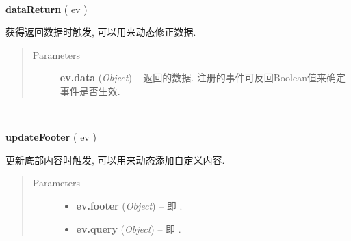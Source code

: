\documentclass[letterpaper,10pt,english]{sphinxmanual}
\begin{document}

\begin{fulllineitems}
\label{api/component/suggest/index:Suggest.dataReturn}~
\begin{DUlineblock}{0em}
\item[] \textbf{dataReturn} ( ev )
\item[] 获得返回数据时触发, 可以用来动态修正数据.
\end{DUlineblock}
\begin{quote}\begin{description}
\item[{Parameters}] \leavevmode
\textbf{ev.data} (\emph{Object}) -- 返回的数据. 注册的事件可反回Boolean值来确定事件是否生效.

\end{description}\end{quote}

\end{fulllineitems}



\begin{fulllineitems}
\label{api/component/suggest/index:Suggest.updateFooter}~
\begin{DUlineblock}{0em}
\item[] \textbf{updateFooter} ( ev )
\item[] 更新底部内容时触发, 可以用来动态添加自定义内容.
\end{DUlineblock}
\begin{quote}\begin{description}
\item[{Parameters}] \leavevmode\begin{itemize}
\item {}
\textbf{ev.footer} (\emph{Object}) -- 即 {\hyperref[api/component/suggest/index:Suggest.footer]{}} .

\item {}
\textbf{ev.query} (\emph{Object}) -- 即 {\hyperref[api/component/suggest/index:Suggest.query]{}} .

\end{itemize}

\end{description}\end{quote}

\end{fulllineitems}
\end{document}
